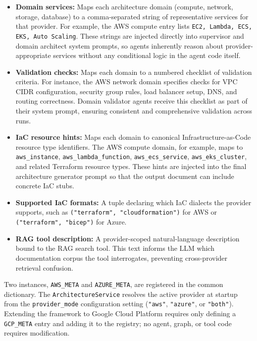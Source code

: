 \begin{itemize}
    \item \textbf{Domain services:} Maps each architecture domain (compute, network, storage, database) to a comma-separated string of representative services for that provider. For example, the AWS compute entry lists \texttt{EC2, Lambda, ECS, EKS, Auto Scaling}. These strings are injected directly into supervisor and domain architect system prompts, so agents inherently reason about provider-appropriate services without any conditional logic in the agent code itself.
    \item \textbf{Validation checks:} Maps each domain to a numbered checklist of validation criteria. For instance, the AWS network domain specifies checks for VPC CIDR configuration, security group rules, load balancer setup, DNS, and routing correctness. Domain validator agents receive this checklist as part of their system prompt, ensuring consistent and comprehensive validation across runs.
    \item \textbf{IaC resource hints:} Maps each domain to canonical Infrastructure-as-Code resource type identifiers. The AWS compute domain, for example, maps to \texttt{aws\_instance}, \texttt{aws\_lambda\_function}, \texttt{aws\_ecs\_service}, \texttt{aws\_eks\_cluster}, and related Terraform resource types. These hints are injected into the final architecture generator prompt so that the output document can include concrete IaC stubs.
    \item \textbf{Supported IaC formats:} A tuple declaring which IaC dialects the provider supports, such as \texttt{("terraform", "cloudformation")} for AWS or \texttt{("terraform", "bicep")} for Azure.
    \item \textbf{RAG tool description:} A provider-scoped natural-language description bound to the RAG search tool. This text informs the LLM which documentation corpus the tool interrogates, preventing cross-provider retrieval confusion.
\end{itemize}

Two instances, \texttt{AWS\_META} and \texttt{AZURE\_META}, are registered in the common dictionary. The \texttt{ArchitectureService} resolves the active provider at startup from the \texttt{provider\_mode} configuration setting (\texttt{"aws"}, \texttt{"azure"}, or \texttt{"both"}). Extending the framework to Google Cloud Platform requires only defining a \texttt{GCP\_META} entry and adding it to the registry; no agent, graph, or tool code requires modification.

